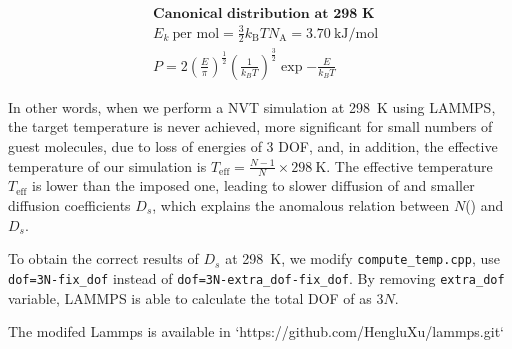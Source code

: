 \documentclass{article}
\begin{document}
\begin{align}
    &\textbf{Canonical distribution at 298~K} \nonumber \\
    \label{eq:3.7}
    &E_k~\text{per mol}
    =\frac{3}{2}k_\text{B} T N_\text{A}=3.70~\text{kJ/mol}\\%
    \label{eq:PvsE}
    &P=2\left(\frac{E}{\pi}\right)^{\frac{1}{2}} \left(\frac{1}{k_BT}\right)^\frac{3}{2} \exp{-\frac{E}{k_BT}}
\end{align}

In other words, when we perform a NVT simulation at 298~K using LAMMPS, the target temperature is never achieved,
more significant for small numbers of guest molecules, due to loss of energies of 3 DOF,
and, in addition, the effective temperature of our simulation is $T_\text{eff}=\frac{N-1}{N}\times 298~\text{K}$.
The effective temperature $T_\text{eff}$ is lower than the imposed one, leading to slower diffusion of  and smaller diffusion coefficients $D_s$, which explains the anomalous relation between $N$() and $D_s$.

To obtain the correct results of $D_s$ at 298~K, we modify \texttt{compute\_temp.cpp},
use \texttt{dof=3N-fix\_dof}
instead of \texttt{dof=3N-extra\_dof-fix\_dof}.
By removing \texttt{extra\_dof} variable, LAMMPS is able to calculate the total DOF of  as $3N$.

The modifed Lammps is available in
`https://github.com/HengluXu/lammps.git`
%
\end{document}
